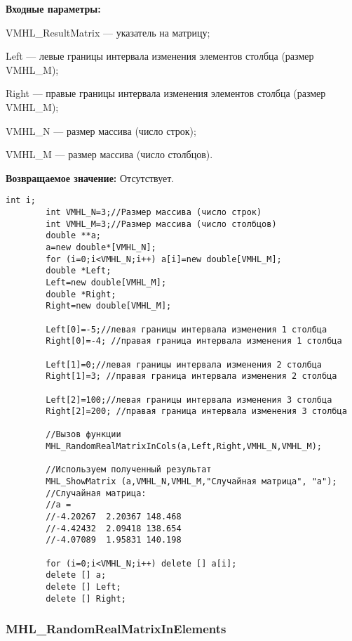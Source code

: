 \documentclass[a4paper,12pt]{article}
\begin{document}
\textbf{Входные параметры:}

 VMHL\_ResultMatrix --- указатель на матрицу;
 
 Left --- левые границы интервала изменения элементов столбца (размер VMHL\_M);
 
 Right --- правые границы интервала изменения элементов столбца (размер VMHL\_M);
 
 VMHL\_N --- размер массива (число строк);
 
 VMHL\_M --- размер массива (число столбцов).

\textbf{Возвращаемое значение:}
Отсутствует.


\begin{lstlisting}[label=code_use_MHL_RandomRealMatrixInCols,caption=Пример использования]
        int i;
        int VMHL_N=3;//Размер массива (число строк)
        int VMHL_M=3;//Размер массива (число столбцов)
        double **a;
        a=new double*[VMHL_N];
        for (i=0;i<VMHL_N;i++) a[i]=new double[VMHL_M];
        double *Left;
        Left=new double[VMHL_M];
        double *Right;
        Right=new double[VMHL_M];

        Left[0]=-5;//левая границы интервала изменения 1 столбца
        Right[0]=-4; //правая граница интервала изменения 1 столбца

        Left[1]=0;//левая границы интервала изменения 2 столбца
        Right[1]=3; //правая граница интервала изменения 2 столбца

        Left[2]=100;//левая границы интервала изменения 3 столбца
        Right[2]=200; //правая граница интервала изменения 3 столбца

        //Вызов функции
        MHL_RandomRealMatrixInCols(a,Left,Right,VMHL_N,VMHL_M);

        //Используем полученный результат
        MHL_ShowMatrix (a,VMHL_N,VMHL_M,"Случайная матрица", "a");
        //Случайная матрица:
        //a =
        //-4.20267	2.20367	148.468
        //-4.42432	2.09418	138.654
        //-4.07089	1.95831	140.198

        for (i=0;i<VMHL_N;i++) delete [] a[i];
        delete [] a;
        delete [] Left;
        delete [] Right;
\end{lstlisting}

\subsubsection{MHL\_RandomRealMatrixInElements}\label{MHL_RandomRealMatrixInElements}
\end{document}
